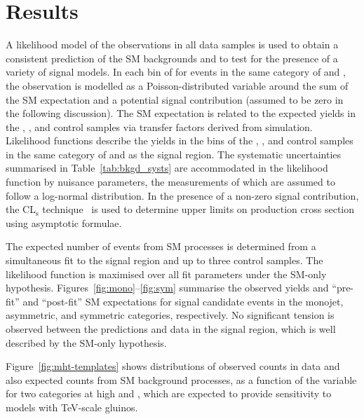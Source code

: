 \section{Results}
\label{sec:interpretation}

A likelihood model of the observations in all data samples is used to
obtain a consistent prediction of the SM backgrounds and to test for
the presence of a variety of signal models.  In each bin of \scalht
for events in the same category of \njet and \nb, the observation is
modelled as a Poisson-distributed variable around the sum of the SM
expectation and a potential signal contribution (assumed to be zero in
the following discussion). The SM expectation is related to the
expected yields in the \mj, \mmj, and \gj control samples via transfer
factors derived from simulation. Likelihood functions describe the
yields in the \scalht bins of the \mj, \mmj, and \gj control samples
in the same category of \njet and \nb as the signal region. The
systematic uncertainties summarised in Table~\ref{tab:bkgd_systs} are
accommodated in the likelihood function by nuisance parameters, the
measurements of which are assumed to follow a log-normal
distribution. In the presence of a non-zero signal contribution, the
CL$_{\mathrm{s}}$ technique~\cite{read, Cowan:2010js} is used to
determine upper limits on production cross section using asymptotic
formulae.

The expected number of events from SM processes is determined from a
simultaneous fit to the signal region and up to three control
samples. The likelihood function is maximised over all fit parameters
under the SM-only hypothesis.
Figures~\ref{fig:mono}--\ref{fig:sym}
summarise the observed yields and ``pre-fit'' and ``post-fit'' SM
expectations for signal candidate events in the monojet, asymmetric,
and symmetric categories, respectively. No significant tension is
observed between the predictions and data in the signal region, which
is well described by the SM-only hypothesis.

Figure~\ref{fig:mht-templates} shows distributions of observed counts
in data and also expected counts from SM background processes, as a
function of the \mht variable for two \nb categories at high \njet and
\scalht, which are expected to provide sensitivity to models with
TeV-scale gluinos. 


